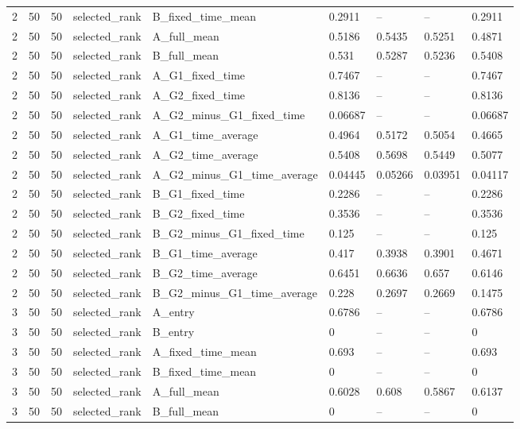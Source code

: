 \begin{longtable}{lllllllll}
2 & 50 & 50 & selected\_rank & B\_fixed\_time\_mean & 0.2911 & -- & -- & 0.2911 \\
2 & 50 & 50 & selected\_rank & A\_full\_mean & 0.5186 & 0.5435 & 0.5251 & 0.4871 \\
2 & 50 & 50 & selected\_rank & B\_full\_mean & 0.531 & 0.5287 & 0.5236 & 0.5408 \\
2 & 50 & 50 & selected\_rank & A\_G1\_fixed\_time & 0.7467 & -- & -- & 0.7467 \\
2 & 50 & 50 & selected\_rank & A\_G2\_fixed\_time & 0.8136 & -- & -- & 0.8136 \\
2 & 50 & 50 & selected\_rank & A\_G2\_minus\_G1\_fixed\_time & 0.06687 & -- & -- & 0.06687 \\
2 & 50 & 50 & selected\_rank & A\_G1\_time\_average & 0.4964 & 0.5172 & 0.5054 & 0.4665 \\
2 & 50 & 50 & selected\_rank & A\_G2\_time\_average & 0.5408 & 0.5698 & 0.5449 & 0.5077 \\
2 & 50 & 50 & selected\_rank & A\_G2\_minus\_G1\_time\_average & 0.04445 & 0.05266 & 0.03951 & 0.04117 \\
2 & 50 & 50 & selected\_rank & B\_G1\_fixed\_time & 0.2286 & -- & -- & 0.2286 \\
2 & 50 & 50 & selected\_rank & B\_G2\_fixed\_time & 0.3536 & -- & -- & 0.3536 \\
2 & 50 & 50 & selected\_rank & B\_G2\_minus\_G1\_fixed\_time & 0.125 & -- & -- & 0.125 \\
2 & 50 & 50 & selected\_rank & B\_G1\_time\_average & 0.417 & 0.3938 & 0.3901 & 0.4671 \\
2 & 50 & 50 & selected\_rank & B\_G2\_time\_average & 0.6451 & 0.6636 & 0.657 & 0.6146 \\
2 & 50 & 50 & selected\_rank & B\_G2\_minus\_G1\_time\_average & 0.228 & 0.2697 & 0.2669 & 0.1475 \\
3 & 50 & 50 & selected\_rank & A\_entry & 0.6786 & -- & -- & 0.6786 \\
3 & 50 & 50 & selected\_rank & B\_entry & 0 & -- & -- & 0 \\
3 & 50 & 50 & selected\_rank & A\_fixed\_time\_mean & 0.693 & -- & -- & 0.693 \\
3 & 50 & 50 & selected\_rank & B\_fixed\_time\_mean & 0 & -- & -- & 0 \\
3 & 50 & 50 & selected\_rank & A\_full\_mean & 0.6028 & 0.608 & 0.5867 & 0.6137 \\
3 & 50 & 50 & selected\_rank & B\_full\_mean & 0 & -- & -- & 0 \\

\end{longtable}
